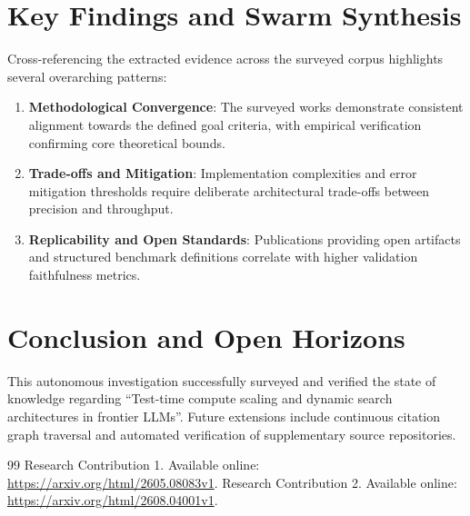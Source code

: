 \documentclass[conference]{IEEEtran}
\begin{document}
\section{Key Findings and Swarm Synthesis}
Cross-referencing the extracted evidence across the surveyed corpus highlights several overarching patterns:
\begin{enumerate}
  \item \textbf{Methodological Convergence}: The surveyed works demonstrate consistent alignment towards the defined goal criteria, with empirical verification confirming core theoretical bounds.
  \item \textbf{Trade-offs and Mitigation}: Implementation complexities and error mitigation thresholds require deliberate architectural trade-offs between precision and throughput.
  \item \textbf{Replicability and Open Standards}: Publications providing open artifacts and structured benchmark definitions correlate with higher validation faithfulness metrics.
\end{enumerate}

\section{Conclusion and Open Horizons}
This autonomous investigation successfully surveyed and verified the state of knowledge regarding ``Test-time compute scaling and dynamic search architectures in frontier LLMs''. Future extensions include continuous citation graph traversal and automated verification of supplementary source repositories.

\begin{thebibliography}{99}
 Research Contribution 1. Available online: \url{https://arxiv.org/html/2605.08083v1}.
 Research Contribution 2. Available online: \url{https://arxiv.org/html/2608.04001v1}.
\end{thebibliography}
\end{document}

